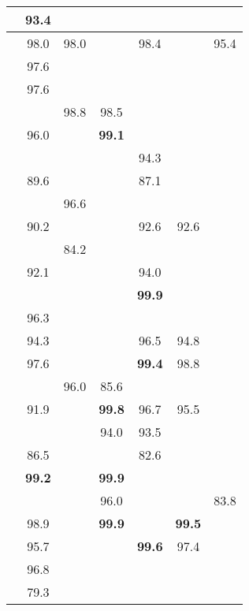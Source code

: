 \documentclass[12pt]{spieman}
\begin{document}
\begin{spacing}{1}
\begin{table}[ht]
\begin{tabular}{|c|c|c|c|c|c|c|}
\cite{Alam2016CRF} & 93.4 &  &  &  &  &  \\ \hline
\cite{Bazi2014} & 98.0 & 98.0 &  & 98.4 &  & 95.4 \\ \hline
\cite{Cao2016Deep} & 97.6 &  &  &  &  &  \\ \hline
\cite{Cao2016Graph} & 97.6 &  &  &  &  &  \\ \hline
\cite{Chen2014Deep} &  & 98.8 & 98.5 &  &  &  \\ \hline
\cite{Chen2015SpectralSpatial} & 96.0 &  & \textbf{99.1} &  &  &  \\ \hline
\cite{fu2016semi} &  &  &  & 94.3 &  &  \\ \hline
\cite{Chen2016DeepFusion} & 89.6 &  &  & 87.1 &  &  \\ \hline
\cite{He2016Hyperspectral} &  & 96.6 &  &  &  &  \\ \hline
\cite{Hu2015Deep} & 90.2 &  &  & 92.6 & 92.6 &  \\ \hline
\cite{Jia2016Convolutional} &  & 84.2 &  &  &  &  \\ \hline
\cite{Lee2016Contextual} & 92.1 &  &  & 94.0 &  &  \\ \hline
\cite{Li2016Active} &  &  &  & \textbf{99.9} &  &  \\ \hline
\cite{Li2015Deep} & 96.3 &  &  &  &  &  \\ \hline
\cite{li2017hyperspectral} & 94.3 &  &  & 96.5 & 94.8 &  \\ \hline
\cite{Li2016Hyperspectral} & 97.6 &  &  & \textbf{99.4} & 98.8 &  \\ \hline
\cite{lin2013spectral} &  & 96.0 & 85.6 &  &  &  \\ \hline
\cite{Liu2015hyperspectral2} & 91.9 &  & \textbf{99.8} & 96.7 & 95.5 &  \\ \hline
\cite{liu2016active} &  &  & 94.0 & 93.5 &  &  \\ \hline
\cite{Ma2016Semisupervised} & 86.5 &  &  & 82.6 &  &  \\ \hline
\cite{ma2016spectral} & \textbf{99.2} &  & \textbf{99.9} &  &  &  \\ \hline
\cite{ma2016hyperspectral} &  &  & 96.0 &  &  & 83.8 \\ \hline
\cite{Makantasis2015Deep} & 98.9 &  & \textbf{99.9} &  & \textbf{99.5} &  \\ \hline
\cite{Mei2016Integrating} & 95.7 &  &  & \textbf{99.6} & 97.4 &  \\ \hline
\cite{Merentitis2015Automatic} & 96.8 &  &  &  &  &  \\ \hline
\cite{Midhun2014Deep} & 79.3 &  &  &  &  &  \\ \hline

\end{tabular}
\end{table}
\end{spacing}
\end{document}
